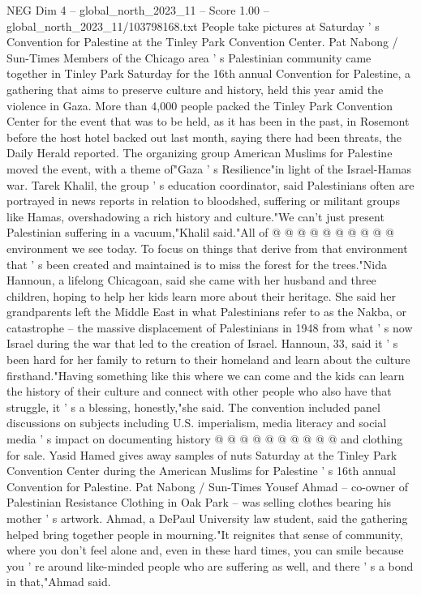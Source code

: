 \begin{textsample}{NEG Dim 4 – global\_north\_2023\_11 – Score 1.00 – global\_north\_2023\_11/103798168.txt}  \label{ex:f4_neg_257}
People take pictures at Saturday ' s Convention for Palestine at the Tinley Park Convention Center.
Pat Nabong / Sun-Times Members of the Chicago area ' s Palestinian community came together in Tinley Park Saturday for the 16th annual Convention for Palestine, a gathering that aims to preserve culture and history, held this year amid the violence in Gaza.
More than 4,000 people packed the Tinley Park Convention Center for the event that was to be held, as it has been in the past, in Rosemont before the host hotel backed out last month, saying there had been threats, the Daily Herald reported.
The organizing group American Muslims for Palestine moved the event, with a theme of"Gaza ' s Resilience"in light of the Israel-Hamas war.
Tarek Khalil, the group ' s education coordinator, said Palestinians often are portrayed in news reports in relation to bloodshed, suffering or militant groups like Hamas, overshadowing a rich history and culture."We can't just present Palestinian suffering in a vacuum,"Khalil said."All of @ @ @ @ @ @ @ @ @ @ environment we see today.
To focus on things that derive from that environment that ' s been created and maintained is to miss the forest for the trees."Nida Hannoun, a lifelong Chicagoan, said she came with her husband and three children, hoping to help her kids learn more about their heritage.
She said her grandparents left the Middle East in what Palestinians refer to as the Nakba, or catastrophe -- the massive displacement of Palestinians in 1948 from what ' s now Israel during the war that led to the creation of Israel.
Hannoun, 33, said it ' s been hard for her family to return to their homeland and learn about the culture firsthand."Having something like this where we can come and the kids can learn the history of their culture and connect with other people who also have that struggle, it ' s a blessing, honestly,"she said.
The convention included panel discussions on subjects including U.S. imperialism, media literacy and social media ' s impact on documenting history @ @ @ @ @ @ @ @ @ @ and clothing for sale.
Yasid Hamed gives away samples of nuts Saturday at the Tinley Park Convention Center during the American Muslims for Palestine ' s 16th annual Convention for Palestine.
Pat Nabong / Sun-Times Yousef Ahmad -- co-owner of Palestinian Resistance Clothing in Oak Park -- was selling clothes bearing his mother ' s artwork.
Ahmad, a DePaul University law student, said the gathering helped bring together people in mourning."It reignites that sense of community, where you don't feel alone and, even in these hard times, you can smile because you ' re around like-minded people who are suffering as well, and there ' s a bond in that,"Ahmad said.

\end{textsample}
